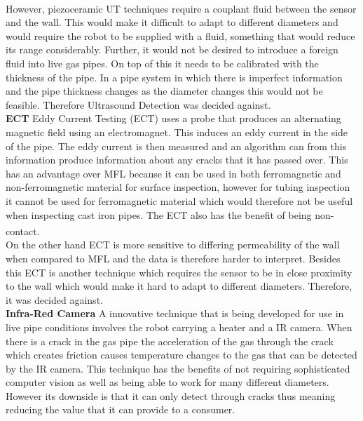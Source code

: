 \documentclass[11pt]{article}		%
\newcommand{\supercite}[1]{\textsuperscript{\cite{#1}}}		%
\begin{document}
	        \\
	        However, piezoceramic UT techniques require a couplant fluid between the sensor and the wall. 
	        This would make it difficult to adapt to different diameters and would require the robot to be supplied with a fluid, something that would reduce its range considerably.
	        Further, it would not be desired to introduce a foreign fluid into live gas pipes. 
	        On top of this it needs to be calibrated with the thickness of the pipe. 
	        In a pipe system in which there is imperfect information and the pipe thickness changes as the diameter changes this would not be feasible. 
	        Therefore Ultrasound Detection was decided against.
	        \\
	        \textbf{ECT}
	        Eddy Current Testing (ECT) uses a probe that produces an alternating magnetic field using an electromagnet.
	        This induces an eddy current in the side of the pipe. 
	        The eddy current is then measured and an algorithm can from this information produce information about any cracks that it has passed over. 
	        This has an advantage over MFL because it can be used in both ferromagnetic and non-ferromagnetic material for surface inspection, however for tubing inspection it cannot be used for ferromagnetic material which would therefore not be useful when inspecting cast iron pipes.
	        The ECT  also has the benefit of being non-contact.\supercite{Corrosion}
	        \\
	        On the other hand ECT is more sensitive to differing permeability of the wall when compared to MFL and the data is therefore harder to interpret. %
	        Besides this ECT is another technique which requires the sensor to be in close proximity to the wall which would make it hard to adapt to different diameters. 
	        Therefore, it was decided against.
	        \\
	        \textbf{Infra-Red Camera}
	        A innovative technique that is being developed for use in live pipe conditions involves the robot carrying a heater and a IR camera. 
	        When there is a crack in the gas pipe the acceleration of the gas through the crack which creates friction causes temperature changes to the gas that can be detected by the IR camera. 
	        This technique has the benefits of not requiring sophisticated computer vision as well as being able to work for many different diameters. 
	        However its downside is that it can only detect through cracks thus meaning reducing the value that it can provide to a consumer. 
\end{document}
